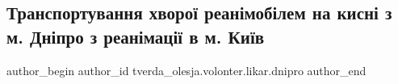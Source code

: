  
 
 
 
 

\subsection{ Транспортування хворої реанімобілем на кисні з м. Дніпро з реанімації в  м. Київ}
\label{sec:27_12_2022.fb.tverda_olesja.volonter.likar.dnipro.1._transportuvannya_kh}

\ifcmt
 author_begin
   author_id tverda_olesja.volonter.likar.dnipro
 author_end
\fi
